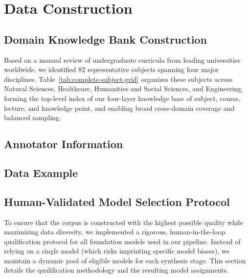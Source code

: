 \section{\ours Data Construction}
\subsection{Domain Knowledge Bank Construction} \label{app:data-knowledge}

Based on a manual review of undergraduate curricula from leading universities worldwide, we identified 82 representative subjects spanning four major disciplines. Table~\ref{tab:complete-subject-grid} organizes these subjects across Natural Sciences, Healthcare, Humanities and Social Sciences, and Engineering, forming the top-level index of our four-layer knowledge base of subject, course, lecture, and knowledge point, and enabling broad cross-domain coverage and balanced sampling.

\clearpage

\subsection{Annotator Information} \label{app:data-annotator}


\clearpage

\subsection{\ours Data Example} \label{app:data-example}





\clearpage




\clearpage


\subsection{Human-Validated Model Selection Protocol}
\label{app:qualified-model}

To ensure that the \ours corpus is constructed with the highest possible quality while maximizing data diversity, we implemented a rigorous, human-in-the-loop qualification protocol for all foundation models used in our pipeline. Instead of relying on a single model (which risks imprinting specific model biases), we maintain a dynamic pool of eligible models for each synthesis stage. This section details the qualification methodology and the resulting model assignments.


